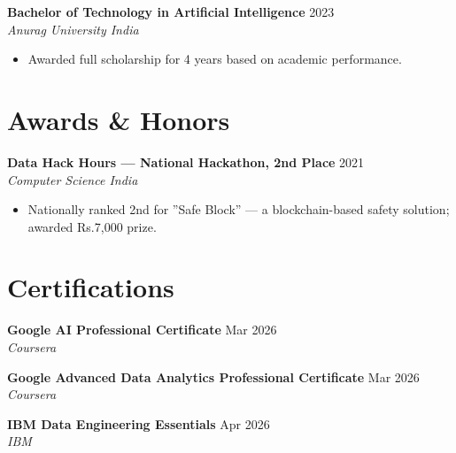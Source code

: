 \documentclass[10pt,letterpaper]{article}
\newcommand{\entry}[3]{%
  \vspace{3pt}\textbf{#1} \hfill #3 \\
  \textit{\small #2}\vspace{1pt}}
\begin{document}
\entry{Bachelor of Technology in Artificial Intelligence}{Anurag University \textbullet{} India}{2023}
\begin{itemize}
  \item Awarded full scholarship for 4 years based on academic performance.
\end{itemize}

\section{Awards \& Honors}

\textbf{Data Hack Hours --- National Hackathon, 2nd Place} \hfill 2021 \\
\textit{Computer Science India}
\begin{itemize}
  \item Nationally ranked 2nd for ''Safe Block'' --- a blockchain-based safety solution; awarded Rs.7,000 prize.
\end{itemize}

\section{Certifications}

\textbf{Google AI Professional Certificate} \hfill Mar 2026 \\
\textit{Coursera}

\textbf{Google Advanced Data Analytics Professional Certificate} \hfill Mar 2026 \\
\textit{Coursera}

\textbf{IBM Data Engineering Essentials} \hfill Apr 2026 \\
\textit{IBM}
\end{document}

